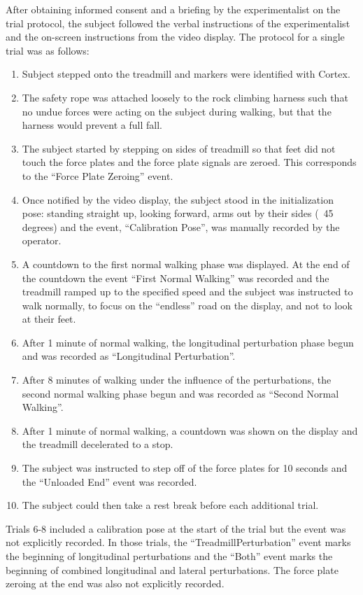 \documentclass[fleqn,12pt]{wlpeerj}
\begin{document}
After obtaining informed consent and a briefing by the experimentalist on the
trial protocol, the subject followed the verbal instructions of the
experimentalist and the on-screen instructions from the video display. The
protocol for a single trial was as follows:
%
\begin{enumerate}
  \item Subject stepped onto the treadmill and markers were identified with
    Cortex.
  \item The safety rope was attached loosely to the rock climbing harness such
    that no undue forces were acting on the subject during walking, but that
    the harness would prevent a full fall.
  \item The subject started by stepping on sides of treadmill so that feet did
    not touch the force plates and the force plate signals are zeroed. This
    corresponds to the ``Force Plate Zeroing'' event.
  \item Once notified by the video display, the subject stood in the
    initialization pose: standing straight up, looking forward, arms out by
    their sides (~45 degrees) and the event, ``Calibration Pose'', was manually
    recorded by the operator.
  \item A countdown to the first normal walking phase was displayed. At the end
    of the countdown the event ``First Normal Walking'' was recorded and the
    treadmill ramped up to the specified speed and the subject was instructed
    to walk normally, to focus on the ``endless'' road on the display, and not
    to look at their feet.
  \item After 1 minute of normal walking, the longitudinal perturbation phase
    begun and was recorded as ``Longitudinal Perturbation''.
  \item After 8 minutes of walking under the influence of the perturbations,
    the second normal walking phase begun and was recorded as ``Second Normal
    Walking''.
  \item After 1 minute of normal walking, a countdown was shown on the display
    and the treadmill decelerated to a stop.
  \item The subject was instructed to step off of the force plates for 10
    seconds and the ``Unloaded End'' event was recorded.
  \item The subject could then take a rest break before each additional trial.
\end{enumerate}

Trials 6-8 included a calibration pose at the start of the trial but the event
was not explicitly recorded. In those trials, the ``TreadmillPerturbation''
event marks the beginning of longitudinal perturbations and the ``Both'' event
marks the beginning of combined longitudinal and lateral perturbations. The
force plate zeroing at the end was also not explicitly recorded.
\end{document}
